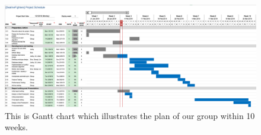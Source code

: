 \documentclass[a4paper]{article}
\begin{document}
{\begin{thebibliography}{9}
\end{thebibliography}

\begin{figure}
\includegraphics[scale=0.4]{Timeline_Ver_0}
\caption{This is Gantt chart which illustrates the plan of our group within 10 weeks.}
\end{figure}
}
\end{document}
